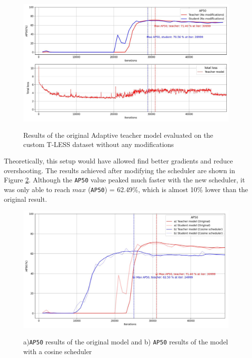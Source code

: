 \begin{figure}[htb]
	\begin{center}
		\includegraphics[width=16cm]{./loss&AP50_original.jpg}
	\end{center}
	\caption{Results of the original Adaptive teacher model evaluated on the custom T-LESS dataset without any modifications}
	\begin{center}
		\label{original_experiment}
	\end{center}
\end{figure}
\FloatBarrier
Theoretically, this setup would have allowed find better gradients and reduce overshooting. The results achieved after modifying the scheduler are shown in Figure \ref{comparison_1}. Although the \texttt{AP50} value peaked much faster with the new scheduler, it was only able to reach $max$ (\texttt{AP50}) = 62.49\%, which is almost 10\% lower than the original result.   



\begin{figure}[htb]
	\begin{center}
		\includegraphics[width=14cm]{./AP50_scheduler.jpg}
	\end{center}
	\caption{a)\texttt{AP50} results of the original model and b) \texttt{AP50} results of the model with a cosine scheduler}
	\begin{center}
		\label{comparison_1}
	\end{center}
\end{figure}
\FloatBarrier

